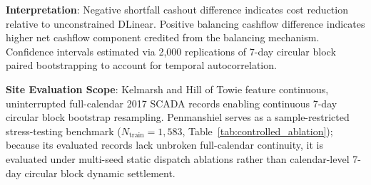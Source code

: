 \begin{table}[!t]
\begin{threeparttable}
\begin{tabularx}{\textwidth}{p{2.2cm}p{3.2cm}>{\centering\arraybackslash}X>{\centering\arraybackslash}X>{\centering\arraybackslash}X}
\bottomrule
\end{tabularx}
\begin{tablenotes}[flushleft]
\footnotesize
\item \textbf{Interpretation}: Negative shortfall cashout difference indicates cost reduction relative to unconstrained DLinear. Positive balancing cashflow difference indicates higher net cashflow component credited from the balancing mechanism. Confidence intervals estimated via 2,000 replications of 7-day circular block paired bootstrapping to account for temporal autocorrelation.
\item \textbf{Site Evaluation Scope}: Kelmarsh and Hill of Towie feature continuous, uninterrupted full-calendar 2017 SCADA records enabling continuous 7-day circular block bootstrap resampling. Penmanshiel serves as a sample-restricted stress-testing benchmark ($N_{\text{train}}=1{,}583$, Table~\ref{tab:controlled_ablation}); because its evaluated records lack unbroken full-calendar continuity, it is evaluated under multi-seed static dispatch ablations rather than calendar-level 7-day circular block dynamic settlement.
\end{tablenotes}
\end{threeparttable}
\end{table}

